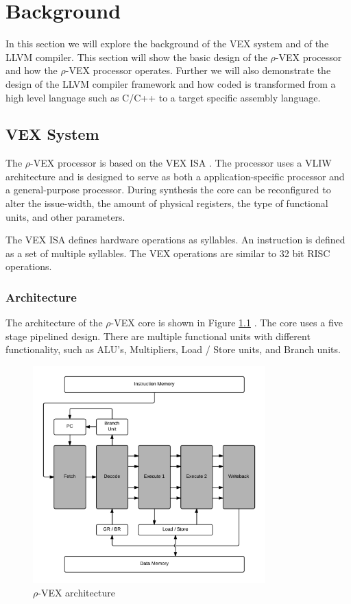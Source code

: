 \chapter{Background}
\label{chap:background}
In this section we will explore the background of the VEX system and of the LLVM compiler. This section will show the basic design of the $\rho$-VEX processor and how the $\rho$-VEX processor operates. Further we will also demonstrate the design of the LLVM compiler framework and how coded is transformed from a high level language such as C/C++ to a target specific assembly language.

\section{VEX System}
The $\rho$-VEX processor is based on the VEX ISA \cite{As:2008rt}. The processor uses a VLIW architecture and is designed to serve as both a application-specific processor and a general-purpose processor. During synthesis the core can be reconfigured to alter the issue-width, the amount of physical registers, the type of functional units, and other parameters.

The VEX ISA defines hardware operations as syllables. An instruction is defined as a set of multiple syllables. The VEX operations are similar to 32 bit RISC operations.

\subsection{Architecture}
The architecture of the $\rho$-VEX core is shown in Figure \ref{fig:rvex_arch} \cite{Seedorf:2011fj}. The core uses a five stage pipelined design. There are multiple functional units with different functionality, such as ALU’s, Multipliers, Load / Store units, and Branch units.

\begin{figure}[ht]
\centering
\includegraphics[width=0.8\textwidth]{2_background/img/rvex_arch.png}
\caption{$\rho$-VEX architecture}
\label{fig:rvex_arch}
\end{figure}

